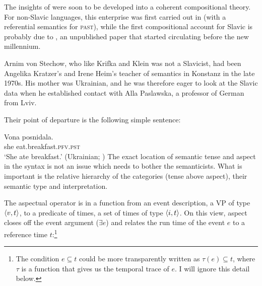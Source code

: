 \documentclass[output=paper,colorlinks,citecolor=brown]{langscibook}
\begin{document}
The insights of  \citet{Klein1995} were soon to be developed into a coherent compositional theory. For non-Slavic languages, this enterprise was first carried out in \citet{kratzer98} (with a referential semantics for \textsc{past}), while the first compositional account for Slavic is probably due to \citet{stechow99}, an unpublished paper that started circulating before the new millennium. 

Arnim von Stechow, who like Krifka and Klein was not a Slavicist, had been Angelika Kratzer's and Irene Heim's teacher of semantics in Konstanz in the late 1970s. His mother was Ukrainian, and he was therefore eager to look at the Slavic data when he established contact with Alla Paslawska, a professor of German from Lviv.

Their point of departure is the following simple sentence:

\ea\label{ukr1}\gll
Vona posnidala.\\
she eat.breakfast.\textsc{pfv}.\textsc{pst}\\
\glt `She ate breakfast.' \hfill (Ukrainian; \cite{stechow99})
\z
The exact location of semantic tense and aspect in the syntax is not an issue which needs to bother the semanticists. What is important is the relative hierarchy of the categories (tense above aspect), their semantic type and  interpretation.

The aspectual operator is in \citet{stechow99} a function from an event description, a VP of type $\langle{v,t}\rangle$, to a predicate of times, a set of times of type $\langle{i,t}\rangle$. On this view, aspect closes off the event argument ($\exists e$) and relates the run time of the event $e$ to a reference time $t$:\footnote{The condition $e \subseteq t$ could be more transparently written as $\tau(e) \subseteq t$, where $\tau$ is a function that gives us the temporal trace of $e$. I will ignore this detail below.}
\end{document}
